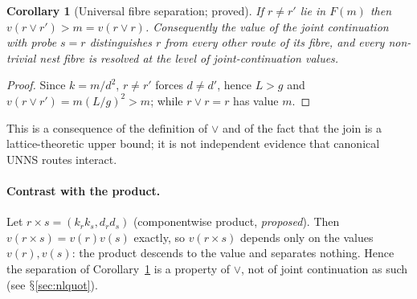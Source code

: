 \documentclass[11pt,a4paper]{article}
\renewcommand{\S}{\ensuremath{\mathsection}}
\newcommand{\vj}{\mathbin{\vee}}
\theoremstyle{plain}
\newtheorem{corollary}[theorem]{Corollary}
\theoremstyle{definition}
\begin{document}
\begin{corollary}[Universal fibre separation; proved]\label{cor:nlsep}
If $r\neq r'$ lie in $F(m)$ then $v(r\vj r')>m=v(r\vj r)$. Consequently the value of the joint continuation with probe $s=r$ distinguishes $r$ from every other route of its fibre, and every non-trivial nest fibre is resolved at the level of joint-continuation values.
\end{corollary}
\begin{proof}
Since $k=m/d^2$, $r\neq r'$ forces $d\ne d'$, hence $L>g$ and $v(r\vj r')=m(L/g)^2>m$; while $r\vj r=r$ has value $m$.
\end{proof}
\noindent This is a consequence of the definition of $\vj$ and of the fact that the join is a lattice-theoretic upper bound; it is not independent evidence that canonical UNNS routes interact.

\paragraph{Contrast with the product.}
Let $r\times s=(k_rk_s,d_rd_s)$ (componentwise product, \emph{proposed}). Then $v(r\times s)=v(r)v(s)$ exactly, so $v(r\times s)$ depends only on the values $v(r),v(s)$: the product descends to the value and separates nothing. Hence the separation of Corollary~\ref{cor:nlsep} is a property of $\vj$, not of joint continuation as such (see \S\ref{sec:nlquot}).

\end{document}
